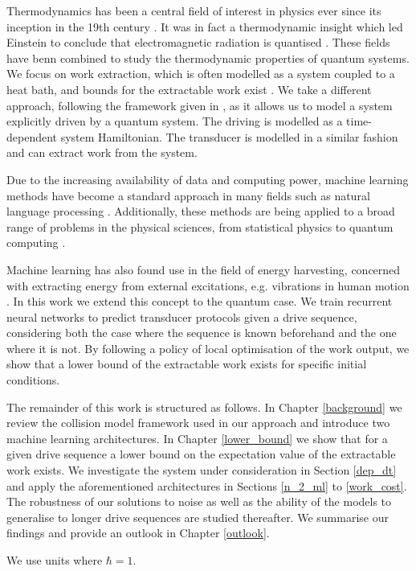 Thermodynamics has been a central field of interest in physics ever since its inception in the 19th century \cite{thomson_2011}.
It was in fact a thermodynamic insight which led Einstein to conclude that electromagnetic radiation is quantised \cite{1905AnP...322..132E}.
These fields have benn combined to study the thermodynamic properties of quantum systems.
We focus on work extraction, which is often modelled as a system coupled to a heat bath, and bounds for the extractable work exist \cite{Egloff_2015}.
We take a different approach, following the framework given in \cite{beyer2020}, as it allows us to model a system explicitly driven by a quantum system.
The driving is modelled as a time-dependent system Hamiltonian.
The transducer is modelled in a similar fashion and can extract work from the system.

Due to the increasing availability of data and computing power, machine learning methods have become a standard approach in many fields such as natural language processing \cite{DBLP:journals/corr/VaswaniSPUJGKP17}.
Additionally, these methods are being applied to a broad range of problems in the physical sciences, from statistical physics to quantum computing \cite{Carleo_2019, wise2021using}.

Machine learning has also found use in the field of energy harvesting, concerned with extracting energy from external excitations, e.g. vibrations in human motion \cite{Liu2019}.
In this work we extend this concept to the quantum case.
We train recurrent neural networks to predict transducer protocols given a drive sequence, considering both the case where the sequence is known beforehand and the one where it is not.
By following a policy of local optimisation of the work output, we show that a lower bound of the extractable work exists for specific initial conditions.

The remainder of this work is structured as follows.
In Chapter \ref{background} we review the collision model framework used in our approach and introduce two machine learning architectures.
In Chapter \ref{lower_bound} we show that for a given drive sequence a lower bound on the expectation value of the extractable work exists.
We investigate the system under consideration in Section \ref{dep_dt} and apply the aforementioned architectures in Sections \ref{n_2_ml} to \ref{work_cost}.
The robustness of our solutions to noise as well as the ability of the models to generalise to longer drive sequences are studied thereafter.
We summarise our findings and provide an outlook in Chapter \ref{outlook}.

We use units where $\hbar = 1$.